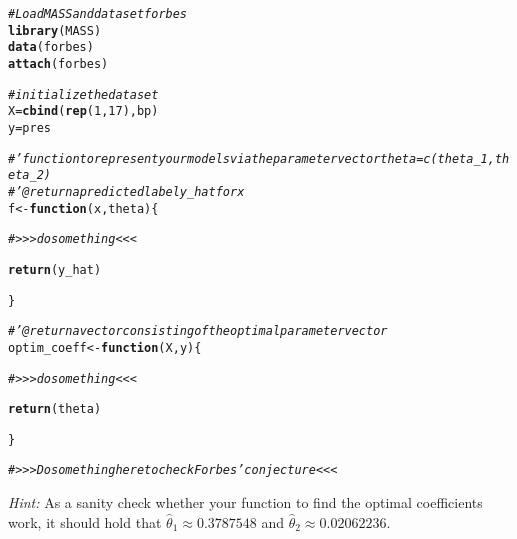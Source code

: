 \documentclass[a4paper]{article}
\makeatletter
\newcommand{\hlnum}[1]{\textcolor[rgb]{0.686,0.059,0.569}{#1}}%
\newcommand{\hlcom}[1]{\textcolor[rgb]{0.678,0.584,0.686}{\textit{#1}}}%
\newcommand{\hlstd}[1]{\textcolor[rgb]{0.345,0.345,0.345}{#1}}%
\newcommand{\hlkwa}[1]{\textcolor[rgb]{0.161,0.373,0.58}{\textbf{#1}}}%
\newcommand{\hlkwb}[1]{\textcolor[rgb]{0.69,0.353,0.396}{#1}}%
\newcommand{\hlkwc}[1]{\textcolor[rgb]{0.333,0.667,0.333}{#1}}%
\newcommand{\hlkwd}[1]{\textcolor[rgb]{0.737,0.353,0.396}{\textbf{#1}}}%
\newenvironment{kframe}{%
 \def\at@end@of@kframe{}%
 \ifinner\ifhmode%
  \def\at@end@of@kframe{\end{minipage}}%
  \begin{minipage}{\columnwidth}%
 \fi\fi%
 \def\FrameCommand##1{\hskip\@totalleftmargin \hskip-\fboxsep
 \colorbox{shadecolor}{##1}\hskip-\fboxsep
     \hskip-\linewidth \hskip-\@totalleftmargin \hskip\columnwidth}%
 \MakeFramed {\advance\hsize-\width
   \@totalleftmargin\z@ \linewidth\hsize
   \@setminipage}}%
 {\par\unskip\endMakeFramed%
 \at@end@of@kframe}
\newenvironment{knitrout}{}{} %
\makeatother
\begin{document}
{\begin{enumerate}
\begin{itemize}
\begin{knitrout}
\begin{kframe}
\begin{alltt}
\hlcom{# Load MASS and data set forbes}
\hlkwd{library}\hlstd{(MASS)}
\hlkwd{data}\hlstd{(forbes)}
\hlkwd{attach}\hlstd{(forbes)}

\hlcom{# initialize the data set}
\hlstd{X} \hlkwb{=} \hlkwd{cbind}\hlstd{(}\hlkwd{rep}\hlstd{(}\hlnum{1}\hlstd{,}\hlnum{17}\hlstd{),bp)}
\hlstd{y} \hlkwb{=} \hlstd{pres}

\hlcom{#' function to represent your models via the parameter vector theta = c(theta_1, theta_2)}
\hlcom{#' @return a predicted label y_hat for x}
\hlstd{f} \hlkwb{<-} \hlkwa{function}\hlstd{(}\hlkwc{x}\hlstd{,} \hlkwc{theta}\hlstd{)\{}

  \hlcom{# >>> do something <<<}

  \hlkwd{return}\hlstd{(y_hat)}

\hlstd{\}}

\hlcom{#' @return a vector consisting of the optimal  parameter vector }
\hlstd{optim_coeff} \hlkwb{<-} \hlkwa{function}\hlstd{(}\hlkwc{X}\hlstd{,}\hlkwc{y}\hlstd{)\{}

  \hlcom{# >>> do something <<<}

  \hlkwd{return}\hlstd{(theta)}

\hlstd{\}}

  \hlcom{# >>>  Do something here to check Forbes' conjecture <<<}
\end{alltt}
\end{kframe}
\end{knitrout}
%
	\emph{Hint:} As a sanity check whether your function to find the optimal coefficients work, it should hold that $\hat\theta_1 \approx 0.3787548$ 	and $\hat\theta_2 \approx 0.02062236.$
	\end{itemize}
%
\end{enumerate}
}
\end{document}
